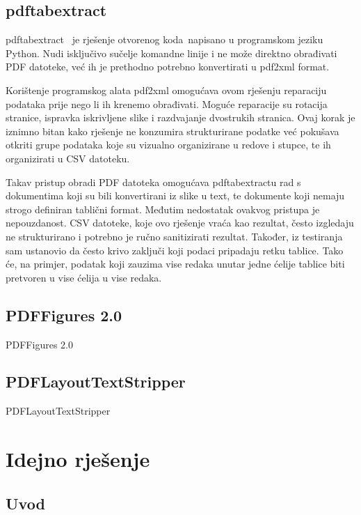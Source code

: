 \documentclass[times, utf8, zavrsni]{fer}
\begin{document}
\section{pdftabextract}

pdftabextract \cite{pdftabextract_repository} je rješenje otvorenog koda napisano
u programskom jeziku Python.
Nudi isključivo sučelje komandne linije i ne može direktno obrađivati PDF
datoteke, već ih je prethodno potrebno konvertirati u pdf2xml format.

Korištenje programskog alata pdf2xml omogućava ovom rješenju reparaciju
podataka prije nego li ih krenemo obrađivati. Moguće reparacije su rotacija
stranice, ispravka iskrivljene slike i razdvajanje dvostrukih stranica. Ovaj
korak je iznimno bitan kako rješenje ne konzumira strukturirane podatke već
pokušava otkriti grupe podataka koje su vizualno organizirane u redove i
stupce, te ih organizirati u CSV datoteku.

Takav pristup obradi PDF datoteka omogućava pdftabextractu rad s dokumentima
koji su bili konvertirani iz slike u text, te dokumente koji nemaju strogo
definiran tablični format. Međutim nedostatak ovakvog pristupa je nepouzdanost.
CSV datoteke, koje ovo rješenje vraća kao rezultat, često izgledaju ne
strukturirano i potrebno je ručno sanitizirati rezultat. Također, iz testiranja
sam ustanovio da često krivo zaključi koji podaci pripadaju retku tablice.
Tako će, na primjer, podatak koji zauzima vise redaka unutar jedne ćelije
tablice biti pretvoren u vise ćelija u vise redaka.

\section{PDFFigures 2.0}

PDFFigures 2.0 \cite{pdffigures_2_repository}

\section{PDFLayoutTextStripper}

PDFLayoutTextStripper \cite{pdflayouttextstripper_repository}



\chapter{Idejno rješenje}

\section{Uvod}
\end{document}
